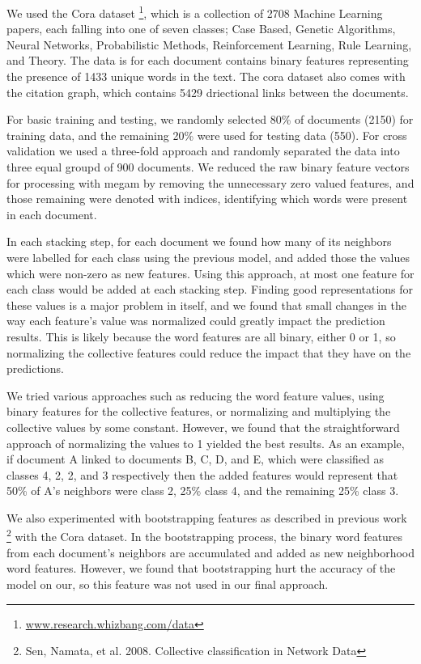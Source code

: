 \documentclass[a4paper,11pt]{article}
\begin{document}
We used the Cora dataset \footnote{\url{www.research.whizbang.com/data}}, which is a collection of
2708 Machine Learning papers, each falling into one of seven
classes; Case Based, Genetic Algorithms, Neural Networks,
Probabilistic Methods, Reinforcement Learning, Rule Learning,
and Theory. The data is for each document contains binary features representing
the presence of 1433 unique words in the text. The cora dataset 
also comes with the citation graph, 
which contains 5429 driectional links between the documents.

For basic training and testing, we randomly selected 80\% of documents (2150) 
for training data, and the remaining 20\% were used for testing data (550).
For cross validation we used a three-fold approach and randomly separated 
the data into three equal groupd of 900 documents. 
We reduced the raw binary feature vectors for processing with megam
by removing the unnecessary zero valued features, and those remaining 
were denoted with indices, identifying which words were present in each document.

In each stacking step, for each document we found how many of its
neighbors were labelled for each class using the previous model, and added 
those the values which were non-zero as new features. Using this approach,
at most one feature for each class would be added at each stacking step.
Finding good representations for these values is a major problem in itself,
and we found that small changes in the way each feature's value was normalized
could greatly impact the prediction results. This is likely because the word
features are all binary, either 0 or 1, so normalizing the collective features
could reduce the impact that they have on the predictions.

We tried various approaches such as reducing the word feature 
values, using binary features for the collective features, or normalizing 
and multiplying the collective values by some constant. However, we found
that the straightforward approach of normalizing the values to 1 yielded 
the best results. As an example, if document A linked to documents 
B, C, D, and E, which were classified as classes 4, 2, 2, and 3
respectively then the added features would represent that 50\% of A's neighbors 
were class 2, 25\% class 4, and the remaining 25\% class 3. 

We also experimented with bootstrapping features as described in previous work
\footnote{Sen, Namata, et al. 2008. Collective classification in Network Data}
with the Cora dataset. In the bootstrapping process, the binary word features from
each document's neighbors are accumulated and added as new neighborhood word features.
However, we found that bootstrapping hurt the accuracy of the model on our, so this
feature was not used in our final approach.
\end{document}
